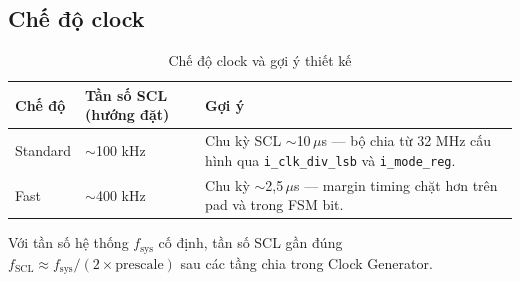 \subsection{Chế độ clock}
\begin{table}[H]
    \centering
    \caption{Chế độ clock và gợi ý thiết kế}
    \label{tab:clock_mode}
    \begin{tabularx}{\textwidth}{|l|l|X|}
        \hline
        \textbf{Chế độ} & \textbf{Tần số SCL (hướng đặt)} & \textbf{Gợi ý} \\
        \hline
        Standard & $\sim$100 kHz & Chu kỳ SCL $\sim$10\,$\mu$s — bộ chia từ 32 MHz cấu hình qua \texttt{i\_clk\_div\_lsb} và \texttt{i\_mode\_reg}. \\
        \hline
        Fast & $\sim$400 kHz & Chu kỳ $\sim$2{,}5\,$\mu$s — margin timing chặt hơn trên pad và trong FSM bit. \\
        \hline
    \end{tabularx}
\end{table}

Với tần số hệ thống $f_{\mathrm{sys}}$ cố định, tần số SCL gần đúng $f_{\mathrm{SCL}} \approx f_{\mathrm{sys}} / (2 \times \mathrm{prescale})$ sau các tầng chia trong Clock Generator.
